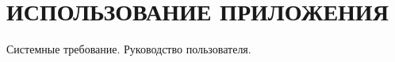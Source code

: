 \section[Использование приложения]{%
  ИСПОЛЬЗОВАНИЕ ПРИЛОЖЕНИЯ
}

Системные требование. Руководство пользователя.